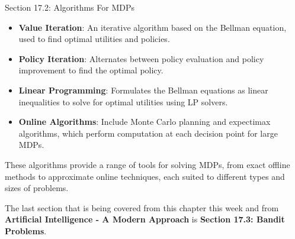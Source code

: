\begin{notes}{Section 17.2: Algorithms For MDPs}
\begin{highlight}
    \end{highlight}
    
    \begin{highlight}
    
        \begin{itemize}
            \item \textbf{Value Iteration}: An iterative algorithm based on the Bellman equation, used to find optimal utilities and policies.
            \item \textbf{Policy Iteration}: Alternates between policy evaluation and policy improvement to find the optimal policy.
            \item \textbf{Linear Programming}: Formulates the Bellman equations as linear inequalities to solve for optimal utilities using LP solvers.
            \item \textbf{Online Algorithms}: Include Monte Carlo planning and expectimax algorithms, which perform computation at each decision point for large MDPs.
        \end{itemize}
    
    These algorithms provide a range of tools for solving MDPs, from exact offline methods to approximate online techniques, each suited to different types and sizes of problems.
    
    \end{highlight}
\end{notes}

The last section that is being covered from this chapter this week and from \textbf{Artificial Intelligence - A Modern Approach} is \textbf{Section 17.3: Bandit Problems}.

